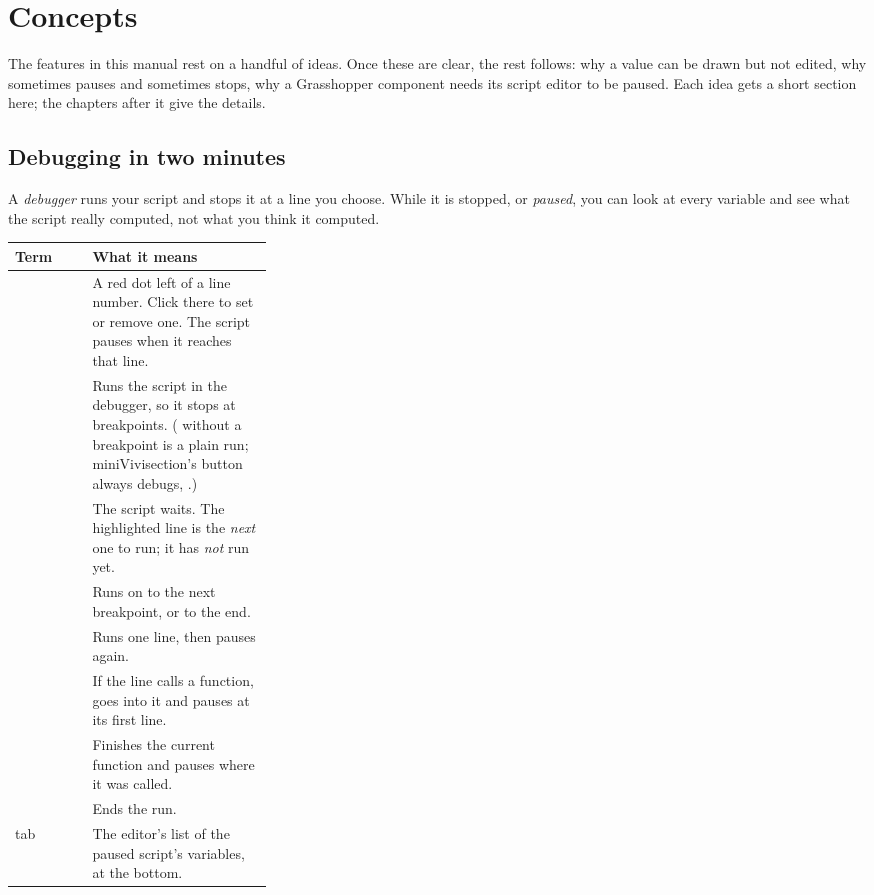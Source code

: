 \chapter{Concepts}\label{ch:concepts}

The features in this manual rest on a handful of ideas. Once these are clear, the rest follows: why a
value can be drawn but not edited, why  sometimes pauses and sometimes stops, why a
Grasshopper component needs its script editor to be paused. Each idea gets a short section here; the
chapters after it give the details.

\section{Debugging in two minutes}\label{sec:debugging}

A \emph{debugger} runs your script and stops it at a line you choose. While it is stopped, or
\emph{paused}, you can look at every variable and see what the script really computed, not what you
think it computed.

\begin{xltabular}{\linewidth}{@{}P{0.3\linewidth}L@{}}
\toprule
\textsf{\textbf{Term}} & \textsf{\textbf{What it means}} \\ \midrule
{}            & A red dot left of a line number. Click there to set or remove one. The script pauses when it reaches that line. \\
         & Runs the script in the debugger, so it stops at breakpoints. ( without a breakpoint is a plain run; miniVivisection's  button always debugs, .) \\
                & The script waits. The highlighted line is the \emph{next} one to run; it has \emph{not} run yet. \\
      & Runs on to the next breakpoint, or to the end. \\
    & Runs one line, then pauses again. \\
    & If the line calls a function, goes into it and pauses at its first line. \\
  & Finishes the current function and pauses where it was called. \\
   & Ends the run. \\
 tab         & The editor's list of the paused script's variables, at the bottom. \\
\bottomrule
\end{xltabular}

